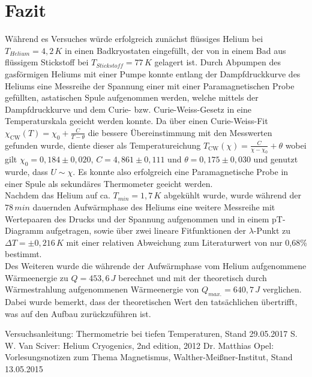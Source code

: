 \documentclass[twoside,colorback,accentcolor=tud4c,11pt]{tudreport}
\begin{document}
\chapter{Fazit}	
Während es Versuches würde erfolgreich zunächst flüssiges Helium bei $T_{Helium}=4,2\,\si{K}$ in einen Badkryostaten eingefüllt, der von in einem Bad aus flüssigem Stickstoff bei $T_{Stickstoff}=77\,\si{K}$ gelagert ist. Durch Abpumpen des gasförmigen Heliums mit einer Pumpe konnte entlang der Dampfdruckkurve des Heliums eine Messreihe der Spannung einer mit einer Paramagnetischen Probe gefüllten, astatischen Spule aufgenommen werden, welche mittels der Dampfdruckkurve und dem Curie- bzw. Curie-Weiss-Gesetz in eine Temperaturskala geeicht werden konnte. Da über einen Curie-Weiss-Fit $\chi_{\text{CW}}(T)=\chi_0+\frac{C}{T-\theta}$ die bessere Übereinstimmung mit den Messwerten gefunden wurde, diente dieser als Temperatureichung $T_{\text{CW}}(\chi)=\frac{C}{\chi-\chi_0}+\theta$ wobei gilt $\chi_0=0,184\pm 0,020$, $C=4,861\pm 0,111$ und $\theta=0,175\pm 0,030$ und genutzt wurde, dass $U\sim\chi$. Es konnte also erfolgreich eine Paramagnetische Probe in einer Spule als sekundäres Thermometer geeicht werden.\\
Nachdem das Helium auf ca. $T_{min}=1,7\,\si{K}$ abgekühlt wurde, wurde während der $78\,\si{min}$ dauernden Aufwärmphase des Heliums eine weitere Messreihe mit Wertepaaren des Drucks und der Spannung aufgenommen und in einem pT-Diagramm aufgetragen, sowie über zwei lineare Fitfunktionen der $\lambda$-Punkt zu $\Delta T=\pm 0,216\,\si{K}$ mit einer relativen Abweichung zum Literaturwert von nur 0,68\% bestimmt.\\
Des Weiteren wurde die währende der Aufwärmphase vom Helium aufgenommene Wärmeenergie zu $Q=453,6\,\si{J}$ berechnet und mit der theoretisch durch Wärmestrahlung aufgenommenen Wärmeenergie von $Q_{max.}=640,7\,\si{J}$ verglichen. Dabei wurde bemerkt, dass der theoretischen Wert den tatsächlichen übertrifft, was auf den Aufbau zurückzuführen ist.
\renewcommand{\bibname}{Literatur}
\begin{thebibliography}{0}
 Versuchsanleitung: Thermometrie bei tiefen Temperaturen, Stand 29.05.2017
 S. W. Van Sciver: Helium Cryogenics, 2nd edition, 2012
 Dr. Matthias Opel: Vorlesungsnotizen zum Thema Magnetismus, Walther-Meißner-Institut, Stand 13.05.2015
\end{thebibliography}
\end{document}
